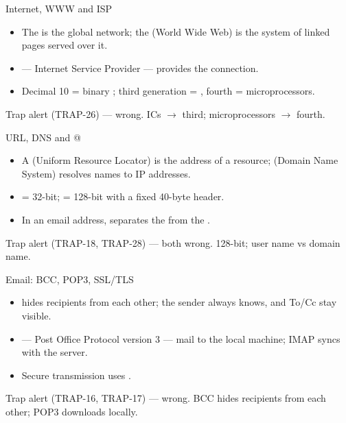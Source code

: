 \documentclass[aspectratio=169]{beamer}
\begin{document}
\begin{frame}{Internet, WWW and ISP}
  \begin{itemize}
    \item The  is the global network; the  (World Wide
      Web) is the system of linked pages served over it.
    \item {} --- Internet Service Provider --- provides the connection.
    \item Decimal 10 = binary ; third generation = , fourth
      = microprocessors.
  \end{itemize}
  \begin{alertblock}{Trap alert (TRAP-26)}
     --- wrong. ICs $\rightarrow$
    third; microprocessors $\rightarrow$ fourth.
  \end{alertblock}
\end{frame}

\begin{frame}{URL, DNS and @}
  \begin{itemize}
    \item A  (Uniform Resource Locator) is the address of a resource;
       (Domain Name System) resolves names to IP addresses.
    \item {} = 32-bit;  = 128-bit with a fixed 40-byte
      header.
    \item In an email address,  separates the  from the
      .
  \end{itemize}
  \begin{alertblock}{Trap alert (TRAP-18, TRAP-28)}
     --- both wrong.
    128-bit; user name vs domain name.
  \end{alertblock}
\end{frame}

\begin{frame}{Email: BCC, POP3, SSL/TLS}
  \begin{itemize}
    \item {} hides recipients from each other; the sender always knows,
      and To/Cc stay visible.
    \item {} --- Post Office Protocol version 3 --- 
      mail to the local machine; IMAP syncs with the server.
    \item Secure transmission uses .
  \end{itemize}
  \begin{alertblock}{Trap alert (TRAP-16, TRAP-17)}
     ---
    wrong. BCC hides recipients from each other; POP3 downloads locally.
  \end{alertblock}
\end{frame}
\end{document}
